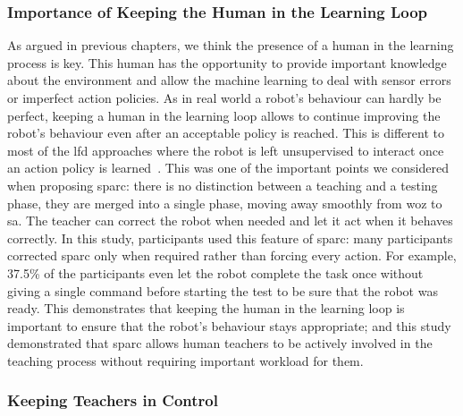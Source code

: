 \subsubsection{Importance of Keeping the Human in the Learning Loop}

As argued in previous chapters, we think the presence of a human in the learning process is key. This human has the opportunity to provide important knowledge about the environment and allow the machine learning to deal with sensor errors or imperfect action policies. As in real world a robot's behaviour can hardly be perfect, keeping a human in the learning loop allows to continue improving the robot's behaviour even after an acceptable policy is reached. This is different to most of the \gls{lfd} approaches where the robot is left unsupervised to interact once an action policy is learned~\citep{argall2009survey,sequeira2016discovering}. This was one of the important points we considered when proposing \gls{sparc}: there is no distinction between a teaching and a testing phase, they are merged into a single phase, moving away smoothly from \gls{woz} to \gls{sa}. The teacher can correct the robot when needed and let it act when it behaves correctly. In this study, participants used this feature of \gls{sparc}: many participants corrected \gls{sparc} only when required rather than forcing every action. For example, 37.5\% of the participants even let the robot complete the task once without giving a single command before starting the test to be sure that the robot was ready. This demonstrates that keeping the human in the learning loop is important to ensure that the robot's behaviour stays appropriate; and this study demonstrated that \gls{sparc} allows human teachers to be actively involved in the teaching process without requiring important workload for them.

\subsubsection{Keeping Teachers in Control}

